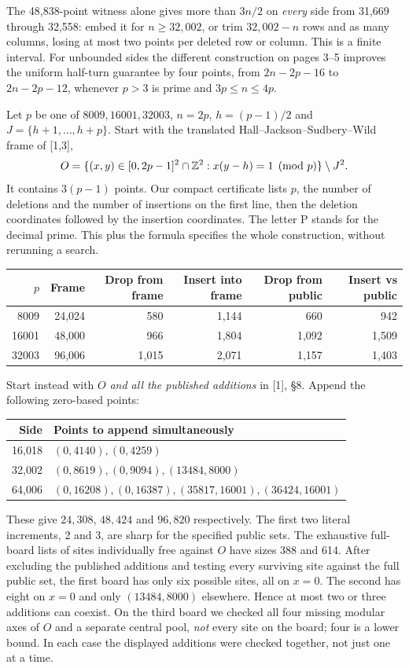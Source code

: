 \documentclass[10pt]{article}
\begin{document}
The 48,838-point witness alone gives more than $3n/2$ on \emph{every} side from 31,669 through 32,558: embed it for $n\ge32,002$, or trim $32,002-n$ rows and as many columns, losing at most two points per deleted row or column. This is a finite interval. For unbounded sides the different construction on pages 3--5 improves the uniform half-turn guarantee by four points, from $2n-2p-16$ to $2n-2p-12$, whenever $p>3$ is prime and $3p\le n\le4p$.

\newpage{}
Let $p$ be one of $8009,16001,32003$, $n=2p$, $h=(p-1)/2$ and $J=\{h+1,\ldots,h+p\}$. Start with the translated Hall--Jackson--Sudbery--Wild frame of [1,3],
\[
 O=\{(x,y)\in[0,2p-1]^2\cap\mathbb Z^2:x(y-h)=1\pmod p\}\setminus J^2.
\]
It contains $3(p-1)$ points. Our compact certificate  lists $p$, the number of deletions and the number of insertions on the first line, then the deletion coordinates followed by the insertion coordinates. The letter P stands for the decimal prime. This plus the formula specifies the whole construction, without rerunning a search.
\begin{center}\begin{tabular}{rrrrrr}\toprule
$p$ & Frame & Drop from frame & Insert into frame & Drop from public & Insert vs public\\\midrule
8009 &24,024 &580 &1,144 &660 &942\\16001 &48,000 &966 &1,804 &1,092 &1,509\\32003 &96,006 &1,015 &2,071 &1,157 &1,403\\\bottomrule\end{tabular}\end{center}
Start instead with $O$ \emph{and all the published additions} in [1], \S8. Append the following zero-based points:
\begin{center}\begin{tabular}{rl}\toprule Side & Points to append simultaneously\\\midrule
16,018 & $(0,4140),(0,4259)$\\32,002 & $(0,8619),(0,9094),(13484,8000)$\\64,006 & $(0,16208),(0,16387),(35817,16001),(36424,16001)$\\\bottomrule\end{tabular}\end{center}
These give $24,308$, $48,424$ and $96,820$ respectively. The first two literal increments, 2 and 3, are sharp for the specified public sets. The exhaustive full-board lists of sites individually free against $O$ have sizes 388 and 614. After excluding the published additions and testing every surviving site against the full public set, the first board has only six possible sites, all on $x=0$. The second has eight on $x=0$ and only $(13484,8000)$ elsewhere. Hence at most two or three additions can coexist. On the third board we checked all four missing modular axes of $O$ and a separate central pool, \emph{not} every site on the board; four is a lower bound. In each case the displayed additions were checked together, not just one at a time.
\end{document}
